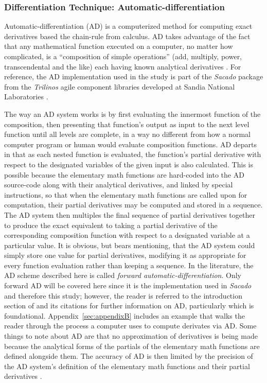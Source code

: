 \documentclass[preprint,12pt]{elsarticle}
\begin{document}
\subsubsection{Differentiation Technique: Automatic-differentiation} 
\label{ADsubsection}

Automatic-differentiation (AD) is a computerized method for computing exact derivatives based the chain-rule from calculus. AD takes advantage of the fact that any mathematical function executed on a computer, no matter how complicated, is a ``composition of simple operations'' (add, multiply, power, transcendental and the like) each having known analytical derivatives \cite{ref-sacado-presentation}. For reference, the AD implementation used in the study is part of the \emph{Sacado} package from the \emph{Trilinos} agile component libraries developed at Sandia National Laboratories \cite{ref-Sacado}.

The way an AD system works is by first evaluating the innermost function of the composition, then presenting that function's output as input to the next level function until all levels are complete, in a way no different from how a normal computer program or human would evaluate composition functions.  AD departs in that as each nested function is evaluated, the function's partial derivative with respect to the designated variables of the given input is also calculated.  This is possible because the elementary math functions are hard-coded into the AD source-code along with their analytical derivatives, and linked by special instructions, so that when the elementary math functions are called upon for computation, their partial derivatives may be computed and stored in a sequence. The AD system then multiples the final sequence of partial derivatives together to produce the exact equivalent to taking a partial derivative of the corresponding composition function with respect to a designated variable at a particular value. It is obvious, but bears mentioning, that the AD system could simply store one value for partial derivatives, modifying it as appropriate for every function evaluation rather than keeping a sequence.  In the literature, the AD scheme described here is called \emph{forward automatic-differentiation}. Only forward AD will be covered here since it is the implementation used in \emph{Sacado} and therefore this study; however, the reader is referred to the introduction section of \cite{ref-AD-methods} and its citations for further information on AD, particularly \cite{ref-on-AD} which is foundational. Appendix~\ref{sec:appendixB} includes an example that walks the reader through the process a computer uses to compute derivates via AD.  Some things to note about AD are that no approximation of derivatives is being made because the analytical forms of the partials of the elementary math functions are defined alongside them. The accuracy of AD is then limited by the precision of the AD system's definition of the elementary math functions and their partial derivatives .
 
\end{document}

